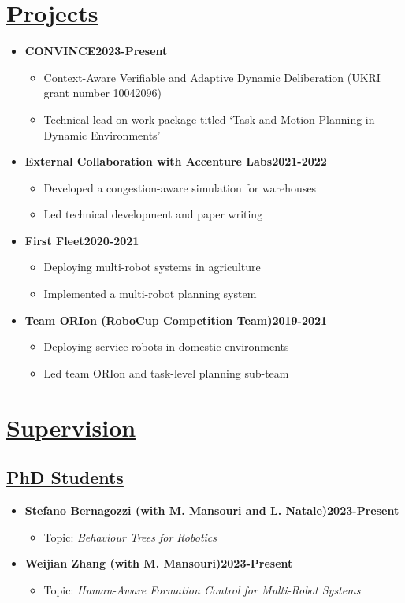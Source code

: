 \documentclass[11pt]{article}
\begin{document}
\section*{\underline{Projects}}
\begin{itemize}
\item \textbf{CONVINCE\hfill 2023-Present}
\begin{itemize}
\item Context-Aware Verifiable and Adaptive Dynamic Deliberation (UKRI grant number 10042096)
\item Technical lead on work package titled `Task and Motion Planning in Dynamic Environments'
\end{itemize}
\item \textbf{External Collaboration with Accenture Labs\hfill 2021-2022}
\begin{itemize}
\item Developed a congestion-aware simulation for warehouses
\item Led technical development and paper writing
\end{itemize}
\item \textbf{First Fleet\hfill 2020-2021}
\begin{itemize}
\item Deploying multi-robot systems in agriculture
\item Implemented a multi-robot planning system
\end{itemize}
\item \textbf{Team ORIon (RoboCup Competition Team)\hfill 2019-2021}
\begin{itemize}
\item Deploying service robots in domestic environments
\item Led team ORIon and task-level planning sub-team
\end{itemize}
\end{itemize}

\section*{\underline{Supervision}}
\subsection*{\underline{PhD Students}}
\begin{itemize}
\item \textbf{Stefano Bernagozzi (with M. Mansouri and L. Natale)\hfill 2023-Present}
\begin{itemize}
\item Topic: \emph{Behaviour Trees for Robotics}
\end{itemize}
\item \textbf{Weijian Zhang (with M. Mansouri)\hfill 2023-Present}
\begin{itemize}
\item Topic: \emph{Human-Aware Formation Control for Multi-Robot Systems}
\end{itemize}
\end{itemize}
\end{document}
